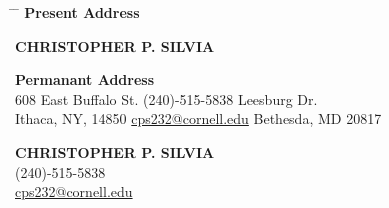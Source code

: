 \documentclass[12pt]{res}
\begin{document}
\begin{tabbing}
\hspace{2.5in} \= \hspace{2.5in} \= \kill
{\bf Present Address} \>	
	\begin{centering}{\bf CHRISTOPHER P. SILVIA}\end{centering}	
	\> {\bf Permanant Address}\\
608 East Buffalo St.  \>	(240)-515-5838			 Leesburg Dr.\\
Ithaca, NY, 14850     \> 	\href{mailto:cps232@cornell.edu}{cps232@cornell.edu} \> Bethesda, MD 20817\\
\end{tabbing}

\begin{centering}
{\bf CHRISTOPHER P. SILVIA}\\
(240)-515-5838\\
\href{mailto:cps232@cornell.edu}{cps232@cornell.edu}\\
\end{centering}

\vspace{30pt}

\address{\bf Present Address \\608 East Buffalo St.\\Ithaca, NY 14850}
\address{\bf Permanant Address \\ 7801 Leesburg Drive \\ Bethesda MD, 20817}
\end{document}
